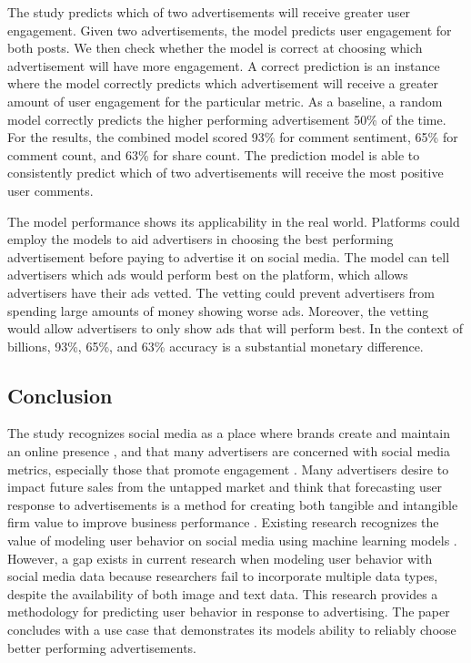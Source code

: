 \documentclass[mksc,blindrev]{informs3} %
\begin{document}
The study predicts which of two advertisements will receive greater user engagement. Given two advertisements, the model predicts user engagement for both posts. We then check whether the model is correct at choosing which advertisement will have more engagement. A correct prediction is an instance where the model correctly predicts which advertisement will receive a greater amount of user engagement for the particular metric. As a baseline, a random model correctly predicts the higher performing advertisement 50\% of the time.  For the results, the combined model scored 93\% for comment sentiment, 65\% for comment count, and 63\% for share count. The prediction model is able to consistently predict which of two advertisements will receive the most positive user comments.

The model performance shows its applicability in the real world.  Platforms could employ the models to aid advertisers in choosing the best performing advertisement before paying to advertise it on social media. The model can tell advertisers which ads would perform best on the platform, which allows advertisers have their ads vetted. The vetting could prevent advertisers from spending large amounts of money showing worse ads. Moreover, the vetting would allow advertisers to only show ads that will perform best. In the context of billions, 93\%, 65\%, and 63\% accuracy is a substantial monetary difference.

\subsection{Conclusion}

The study recognizes social media as a place where brands create and maintain an online presence \cite{Greenwood2016}, and that many advertisers are concerned with social media metrics, especially those that promote engagement \cite{Tiago2014}. Many advertisers desire to impact future sales from the untapped market \cite{Guo2020} and think that forecasting user response to advertisements is a method for creating both tangible and intangible firm value to improve business performance \cite{Authors2013}. Existing research recognizes the value of modeling user behavior on social media using machine learning models \cite{Li2015, 8029313, Ohsawa2013, Liu2012, Li2015}. However, a gap exists in current research when modeling user behavior with social media data because researchers fail to incorporate multiple data types, despite the availability of both image and text data. This research provides a methodology for predicting user behavior in response to advertising. The paper concludes with a use case that demonstrates its models ability to reliably choose better performing advertisements.
\end{document}
